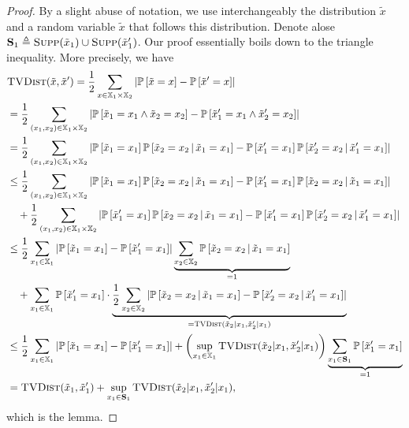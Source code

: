\begin{proof}
    By a slight abuse of notation, 
    we use interchangeably the distribution $\tilde x$
    and a random variable $\tilde x$ that follows this distribution.
    Denote alose ${\bf S}_1 \triangleq \textsc{Supp}(\tilde x_1) \cup \textsc{Supp}(\tilde x_1')$.
    Our proof essentially boils down to the triangle inequality.
    More precisely, we have
    \begin{align}
        &\textsc{TVDist} (\tilde x, \tilde x') 
        = \frac{1}{2} \sum_{x \in \mathbb X_1 \times \mathbb X_2} \left\lvert{
            \mathbb P\left[\tilde x = x\right]
            - \mathbb P\left[\tilde x' = x\right]
        }\right\rvert \\
        &= \frac{1}{2} \sum_{(x_1, x_2) \in \mathbb X_1 \times \mathbb X_2} \left\lvert{
            \mathbb P\left[\tilde x_1 = x_1 \wedge \tilde x_2 = x_2\right]
            - \mathbb P\left[\tilde x_1' = x_1 \wedge \tilde x_2' = x_2\right]
        }\right\rvert \\
        &= \frac{1}{2} \sum_{(x_1, x_2) \in \mathbb X_1 \times \mathbb X_2} \left\lvert{
            \mathbb P\left[\tilde x_1 = x_1\right] \mathbb P\left[\tilde x_2 = x_2 \,\middle|\,\tilde x_1 = x_1\right]
            - \mathbb P\left[\tilde x_1' = x_1\right] \mathbb P\left[\tilde x_2' = x_2 \,\middle|\,\tilde x_1' = x_1\right]
        }\right\rvert \\
        &\leq \frac{1}{2} \sum_{(x_1, x_2) \in \mathbb X_1 \times \mathbb X_2} \left\lvert{
            \mathbb P\left[\tilde x_1 = x_1\right] \mathbb P\left[\tilde x_2 = x_2 \,\middle|\,\tilde x_1 = x_1\right]
            - \mathbb P\left[\tilde x_1' = x_1\right] \mathbb P\left[\tilde x_2 = x_2 \,\middle|\,\tilde x_1 = x_1\right]
        }\right\rvert \nonumber \\
        &\quad + \frac{1}{2} \sum_{(x_1, x_2) \in \mathbb X_1 \times \mathbb X_2} \left\lvert{
            \mathbb P\left[\tilde x_1' = x_1\right] \mathbb P\left[\tilde x_2 = x_2 \,\middle|\,\tilde x_1 = x_1\right]
            - \mathbb P\left[\tilde x_1' = x_1\right] \mathbb P\left[\tilde x_2' = x_2 \,\middle|\,\tilde x_1' = x_1\right]
        }\right\rvert \\
        &\leq \frac{1}{2} \sum_{x_1 \in \mathbb X_1} 
        \left\lvert{
            \mathbb P\left[\tilde x_1 = x_1\right] - \mathbb P\left[\tilde x_1' = x_1\right]
        }\right\rvert \underbrace{
            \sum_{x_2 \in \mathbb X_2} \mathbb P\left[\tilde x_2 = x_2 \,\middle|\, \tilde x_1 = x_1\right]
        }_{= 1}
        \nonumber \\
        &\quad + \sum_{x_1 \in \mathbb X_1} 
        \mathbb P\left[\tilde x_1' = x_1\right] \cdot \underbrace{
            \frac{1}{2} \sum_{x_2 \in \mathbb X_2} \left\lvert{
                \mathbb P\left[\tilde x_2 = x_2 \,\middle|\,\tilde x_1 = x_1\right]
                - \mathbb P\left[\tilde x_2' = x_2 \,\middle|\,\tilde x_1' = x_1\right]
            }\right\rvert
        }_{= \textsc{TVDist}(\tilde x_2|x_1, \tilde x_2'|x_1)} \\
        &\leq \frac{1}{2} \sum_{x_1 \in \mathbb X_1} \left\lvert{
            \mathbb P\left[\tilde x_1 = x_1\right] - \mathbb P\left[\tilde x_1' = x_1\right]
        }\right\rvert + \left( 
            \sup_{x_1 \in \mathbb X_1} 
            \textsc{TVDist}(\tilde x_2 | x_1, \tilde x_2' | x_1) 
        \right) \underbrace{\sum_{x_1 \in {\bf S}_1} \mathbb P\left[\tilde x_1' = x_1\right]}_{= 1} \\
        &= \textsc{TVDist}(\tilde x_1, \tilde x_1')
        + \sup_{x_1 \in {\bf S}_1} 
            \textsc{TVDist}(\tilde x_2 | x_1, \tilde x_2' | x_1),
    \end{align}
    which is the lemma.
\end{proof}

